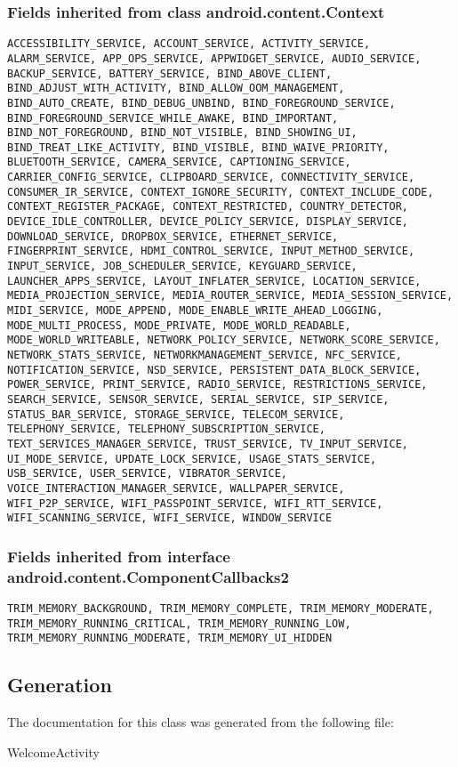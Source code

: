 \subsubsection{Fields inherited from class android.content.Context}
\begin{lstlisting}
ACCESSIBILITY_SERVICE, ACCOUNT_SERVICE, ACTIVITY_SERVICE, ALARM_SERVICE, APP_OPS_SERVICE, APPWIDGET_SERVICE, AUDIO_SERVICE, BACKUP_SERVICE, BATTERY_SERVICE, BIND_ABOVE_CLIENT, BIND_ADJUST_WITH_ACTIVITY, BIND_ALLOW_OOM_MANAGEMENT, BIND_AUTO_CREATE, BIND_DEBUG_UNBIND, BIND_FOREGROUND_SERVICE, BIND_FOREGROUND_SERVICE_WHILE_AWAKE, BIND_IMPORTANT, BIND_NOT_FOREGROUND, BIND_NOT_VISIBLE, BIND_SHOWING_UI, BIND_TREAT_LIKE_ACTIVITY, BIND_VISIBLE, BIND_WAIVE_PRIORITY, BLUETOOTH_SERVICE, CAMERA_SERVICE, CAPTIONING_SERVICE, CARRIER_CONFIG_SERVICE, CLIPBOARD_SERVICE, CONNECTIVITY_SERVICE, CONSUMER_IR_SERVICE, CONTEXT_IGNORE_SECURITY, CONTEXT_INCLUDE_CODE, CONTEXT_REGISTER_PACKAGE, CONTEXT_RESTRICTED, COUNTRY_DETECTOR, DEVICE_IDLE_CONTROLLER, DEVICE_POLICY_SERVICE, DISPLAY_SERVICE, DOWNLOAD_SERVICE, DROPBOX_SERVICE, ETHERNET_SERVICE, FINGERPRINT_SERVICE, HDMI_CONTROL_SERVICE, INPUT_METHOD_SERVICE, INPUT_SERVICE, JOB_SCHEDULER_SERVICE, KEYGUARD_SERVICE, LAUNCHER_APPS_SERVICE, LAYOUT_INFLATER_SERVICE, LOCATION_SERVICE, MEDIA_PROJECTION_SERVICE, MEDIA_ROUTER_SERVICE, MEDIA_SESSION_SERVICE, MIDI_SERVICE, MODE_APPEND, MODE_ENABLE_WRITE_AHEAD_LOGGING, MODE_MULTI_PROCESS, MODE_PRIVATE, MODE_WORLD_READABLE, MODE_WORLD_WRITEABLE, NETWORK_POLICY_SERVICE, NETWORK_SCORE_SERVICE, NETWORK_STATS_SERVICE, NETWORKMANAGEMENT_SERVICE, NFC_SERVICE, NOTIFICATION_SERVICE, NSD_SERVICE, PERSISTENT_DATA_BLOCK_SERVICE, POWER_SERVICE, PRINT_SERVICE, RADIO_SERVICE, RESTRICTIONS_SERVICE, SEARCH_SERVICE, SENSOR_SERVICE, SERIAL_SERVICE, SIP_SERVICE, STATUS_BAR_SERVICE, STORAGE_SERVICE, TELECOM_SERVICE, TELEPHONY_SERVICE, TELEPHONY_SUBSCRIPTION_SERVICE, TEXT_SERVICES_MANAGER_SERVICE, TRUST_SERVICE, TV_INPUT_SERVICE, UI_MODE_SERVICE, UPDATE_LOCK_SERVICE, USAGE_STATS_SERVICE, USB_SERVICE, USER_SERVICE, VIBRATOR_SERVICE, VOICE_INTERACTION_MANAGER_SERVICE, WALLPAPER_SERVICE, WIFI_P2P_SERVICE, WIFI_PASSPOINT_SERVICE, WIFI_RTT_SERVICE, WIFI_SCANNING_SERVICE, WIFI_SERVICE, WINDOW_SERVICE
\end{lstlisting}
\subsubsection{Fields inherited from interface android.content.ComponentCallbacks2}
\begin{lstlisting}
TRIM_MEMORY_BACKGROUND, TRIM_MEMORY_COMPLETE, TRIM_MEMORY_MODERATE, TRIM_MEMORY_RUNNING_CRITICAL, TRIM_MEMORY_RUNNING_LOW, TRIM_MEMORY_RUNNING_MODERATE, TRIM_MEMORY_UI_HIDDEN
\end{lstlisting}


\subsection{Generation}
The documentation for this class was generated from the following file\-:
\begin{DoxyCompactItemize}
\item WelcomeActivity
\end{DoxyCompactItemize} 









